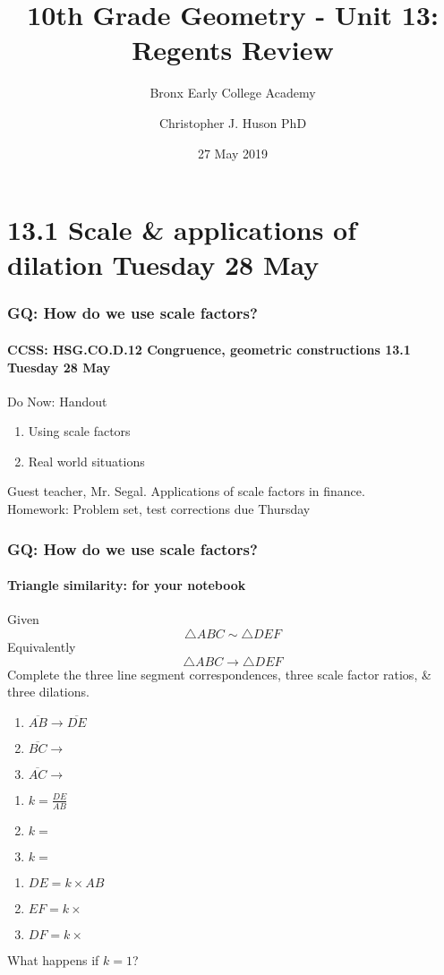 \documentclass{beamer}
\title{10th Grade Geometry - Unit 13: Regents Review}
\subtitle{Bronx Early College Academy}
\author{Christopher J. Huson PhD}
\date{27 May 2019}
\begin{document}
\frame{\titlepage}
\section[Outline]{}
\frame{\tableofcontents}


\section{13.1 Scale \& applications of dilation Tuesday 28 May}
  \frame
  {
    \frametitle{GQ: How do we use scale factors?}
    \framesubtitle{CCSS: HSG.CO.D.12 Congruence, geometric constructions \hfill \alert{13.1 Tuesday 28 May}}

    \begin{block}{Do Now: Handout}
      \begin{enumerate}
        \item Using scale factors
        \item Real world situations
      \end{enumerate}
    \end{block}
    Guest teacher, Mr. Segal. Applications of scale factors in finance.\\[0.25cm]
    Homework: Problem set, test corrections due Thursday
  }

  \frame
  {
    \frametitle{GQ: How do we use scale factors?}
    \framesubtitle{Triangle similarity: for your notebook}
      Given  \[\triangle ABC \sim \triangle DEF \]
      Equivalently \[ \triangle ABC \rightarrow \triangle DEF \]
      Complete the three line segment correspondences, three scale factor ratios, \& three dilations.\\[0.5cm]
        \begin{multicols}{3}
          \renewcommand{\baselinestretch}{1.5}
          \begin{enumerate}
            \item $\overline{AB} \rightarrow \overline{DE} $
            \item $\overline{BC} \rightarrow$
            \item $\overline{AC} \rightarrow$
          \end{enumerate}
          \begin{enumerate}
            \item $k= \frac{DE}{AB}$
            \item $k=$
            \item $k=$
          \end{enumerate}
          \begin{enumerate}
            \item $DE= k \times AB$
            \item $EF= k \times $
            \item $DF= k \times $
          \end{enumerate}
        \end{multicols}

  What happens if $k=1$?
  }
\end{document}
